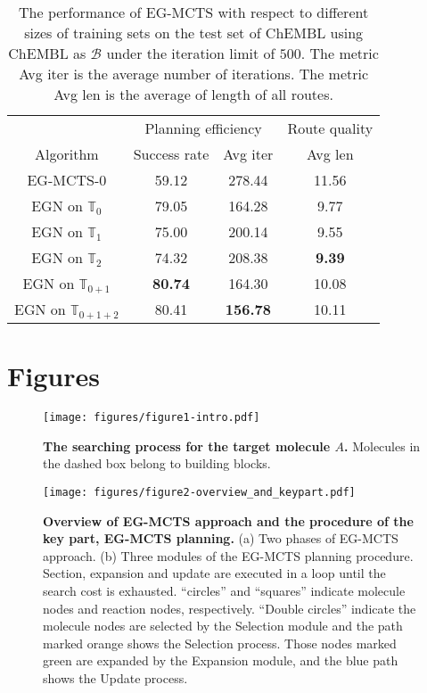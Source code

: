 \documentclass[sn-mathphys,Numbered]{sn-jnl}
\begin{document}
\begin{table}[!ht]
    \caption{The performance of EG-MCTS with respect to different sizes of training sets on the test set of ChEMBL using ChEMBL as $\mathcal{B}$ under the iteration limit of $500$. The metric Avg iter is the average number of iterations. The metric Avg len is the average of length of all routes.}
    \label{table-trainsize}
    \centering
    \begin{tabular}{cccc}
            \toprule
            & \multicolumn{2}{c}{Planning efficiency }   & \multicolumn{1}{c}{Route quality}             \\
            \cmidrule(r){2-3} \cmidrule(r){4-4} 
             Algorithm & Success rate & Avg iter & Avg len\\
             \midrule
            EG-MCTS-0 & 59.12 & 278.44  & 11.56\\
             EGN on $\mathbb{T}_0$ & 79.05 & 164.28  & 9.77\\
             EGN on $\mathbb{T}_1$ & 75.00 & 200.14  & 9.55\\
             
             EGN on $\mathbb{T}_2$ &  74.32   & 208.38   & \textbf{9.39} \\
             EGN on $\mathbb{T}_{0+1}$ &  \textbf{80.74}  & 164.30   & 10.08 \\
             EGN on $\mathbb{T}_{0+1+2}$ & 80.41 & \textbf{156.78}  & 10.11\\
             \bottomrule
        \end{tabular}

\end{table}

\clearpage
\section{Figures}

\begin{figure*}[!ht]
\centering
\texttt{[image: figures/figure1-intro.pdf]}
\caption{\textbf{The searching process for the target molecule $A$.} Molecules in the dashed box belong to building blocks.}
\label{figure1-intro}
\end{figure*}

\begin{figure*}[!ht]
\centering
\texttt{[image: figures/figure2-overview\_and\_keypart.pdf]}
\caption{\textbf{Overview of EG-MCTS approach and the procedure of the key part, EG-MCTS planning. }(a) Two phases of EG-MCTS approach. (b) Three modules of the EG-MCTS planning procedure. Section, expansion and update are executed in a loop until the search cost is exhausted. ``circles'' and ``squares'' indicate molecule nodes and reaction nodes, respectively. ``Double circles'' indicate the molecule nodes are selected by the Selection module and the path marked orange shows the Selection process. Those nodes marked green are expanded by the Expansion module, and the blue path shows the Update process. }
\label{figure2-overview_and_keypart}
\end{figure*}
\end{document}
